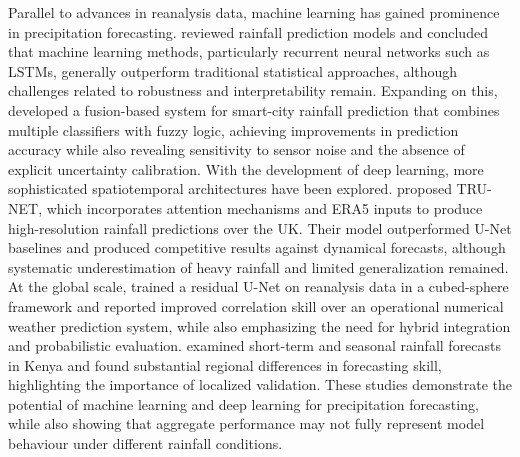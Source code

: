 \documentclass[referee,pdflatex,sn-basic]{sn-jnl}%
\theoremstyle{thmstyleone}%
\theoremstyle{thmstyletwo}%
\theoremstyle{thmstylethree}%
\begin{document}
Parallel to advances in reanalysis data, machine learning has gained prominence in precipitation forecasting. \citet{latif2023assessing} reviewed rainfall prediction models and concluded that machine learning methods, particularly recurrent neural networks such as LSTMs, generally outperform traditional statistical approaches, although challenges related to robustness and interpretability remain. Expanding on this, \citet{rahman2022rainfall} developed a fusion-based system for smart-city rainfall prediction that combines multiple classifiers with fuzzy logic, achieving improvements in prediction accuracy while also revealing sensitivity to sensor noise and the absence of explicit uncertainty calibration. With the development of deep learning, more sophisticated spatiotemporal architectures have been explored. \citet{adewoyin2021tru} proposed TRU-NET, which incorporates attention mechanisms and ERA5 inputs to produce high-resolution rainfall predictions over the UK. Their model outperformed U-Net baselines and produced competitive results against dynamical forecasts, although systematic underestimation of heavy rainfall and limited generalization remained. At the global scale, \citet{singh2021deep} trained a residual U-Net on reanalysis data in a cubed-sphere framework and reported improved correlation skill over an operational numerical weather prediction system, while also emphasizing the need for hybrid integration and probabilistic evaluation. \citet{miller2021analysis} examined short-term and seasonal rainfall forecasts in Kenya and found substantial regional differences in forecasting skill, highlighting the importance of localized validation. These studies demonstrate the potential of machine learning and deep learning for precipitation forecasting, while also showing that aggregate performance may not fully represent model behaviour under different rainfall conditions.
\end{document}
